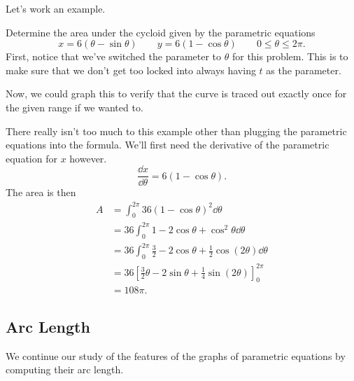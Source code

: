Let's work an example.

\begin{example}\label{eg_cycloid_area}
Determine the area under the cycloid given by the parametric equations
\[x=6(\theta-\sin\theta)\qquad y=6(1-\cos\theta)\qquad 0\le\theta\le2\pi.\]
\solution
First, notice that we've switched the parameter to $\theta$ for this problem.  This is to make sure that we don't get too locked into always having $t$ as the parameter.

Now, we could graph this to verify that the curve is traced out exactly once for the given range if we wanted to.
 
There really isn't too much to this example other than plugging the parametric equations into the formula.  We'll first need the derivative of the parametric equation for $x$ however.
\[\frac{\dd x}{\dd\theta}=6(1-\cos\theta).\]
The area is then
\begin{align*}
A
&=\int_0^{2\pi}36(1-\cos\theta)^2\dd\theta\\
&=36\int_0^{2\pi}1-2\cos\theta+\cos^2\theta\dd\theta\\
&=36\int_0^{2\pi}\frac32-2\cos\theta+\frac12\cos(2\theta)\dd\theta\\
&=36\left[\frac32\theta-2\sin\theta+\frac14\sin(2\theta)\right]_0^{2\pi}\\
&=108\pi.
\end{align*}
\end{example}


\subsection{Arc Length}

We continue our study of the features of the graphs of parametric equations by computing their arc length.

